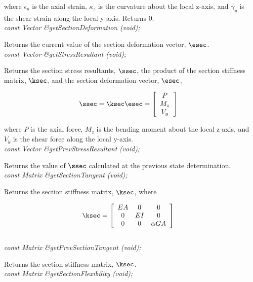 where $\epsilon_a$ is the axial strain, $\kappa_z$ is the curvature about
the local z-axis, and $\gamma_y$ is the shear strain along the local y-axis.
Returns $0$. \\

{\em const Vector \&getSectionDeformation (void); } 

Returns the current value of the section deformation vector, $\esec$. \\

{\em const Vector \&getStressResultant (void); } 

Returns the section stress resultants, $\ssec$, the product of the 
section stiffness matrix, $\ksec$, and the section deformation 
vector, $\esec$,

\begin{equation}
\ssec = \ksec \esec = \left[
   \begin{array}{c}
       P \\
       M_z   \\
       V_y
   \end{array} 
 \right]
\end{equation}

where $P$ is the axial force, $M_z$ is the bending moment about the
local z-axis, and $V_y$ is the shear force along the local y-axis. \\

{\em const Vector \&getPrevStressResultant (void); } 

Returns the value of $\ssec$ calculated at the previous state determination. \\

{\em const Matrix \&getSectionTangent (void); } 

Returns the section stiffness matrix, $\ksec$, where 

\begin{equation}
\ksec = \left[
   \begin{array}{ccc}
       EA &  0 &  0 \\
        0 & EI &  0 \\
        0 &  0 & \alpha GA
   \end{array} 
 \right]
\end{equation} \\

{\em const Matrix \&getPrevSectionTangent (void); } 

Returns the section stiffness matrix, $\ksec$. \\

{\em const Matrix \&getSectionFlexibility (void); } 

